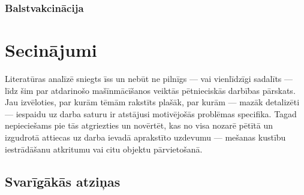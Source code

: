 \documentclass[12pt, a4paper]{article}
\numberwithin{equation}{section} %
\begin{document}
\subsubsection{Balstvakcinācija}


\section{Secinājumi}

Literatūras analīzē sniegts īss un nebūt ne pilnīgs --- vai vienlīdzīgi sadalīts --- līdz šim par atdarinošo mašīnmācīšanos veiktās pētnieciskās darbības pārskats. Jau izvēloties, par kurām tēmām rakstīts plašāk, par kurām --- mazāk detalizēti --- iespaidu uz darba saturu ir atstājusi motivējošās problēmas specifika. Tagad nepieciešams pie tās atgriezties un novērtēt, kas no visa nozarē pētītā un izgudrotā attiecas uz darba ievadā aprakstīto uzdevumu --- mešanas kustību iestrādāšanu atkritumu vai citu objektu pārvietošanā.

\subsection{Svarīgākās atziņas}


\newpage
{}
\printbibliography[title=Atsauces]
\end{document}
